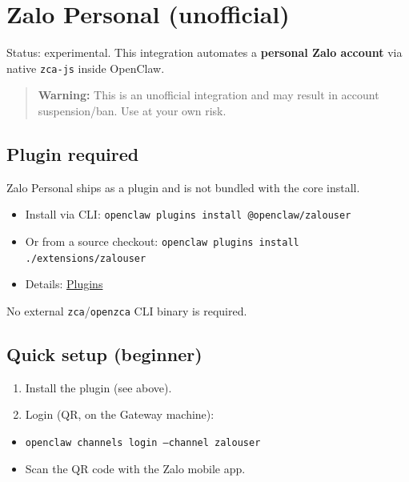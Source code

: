 \clearpage

\section{Zalo Personal (unofficial)}


Status: experimental. This integration automates a \textbf{personal Zalo account} via native \texttt{zca-js} inside OpenClaw.

\begin{quote}
\textbf{Warning:} This is an unofficial integration and may result in account suspension/ban. Use at your own risk.
\end{quote}


\subsection{Plugin required}


Zalo Personal ships as a plugin and is not bundled with the core install.

\begin{itemize}
  \item Install via CLI: \texttt{openclaw plugins install @openclaw/zalouser}
  \item Or from a source checkout: \texttt{openclaw plugins install ./extensions/zalouser}
  \item Details: \href{/tools/plugin}{Plugins}
\end{itemize}


No external \texttt{zca}/\texttt{openzca} CLI binary is required.

\subsection{Quick setup (beginner)}


\begin{enumerate}
  \item Install the plugin (see above).
  \item Login (QR, on the Gateway machine):
\end{enumerate}

\begin{itemize}
  \item \texttt{openclaw channels login --channel zalouser}
  \item Scan the QR code with the Zalo mobile app.
\end{itemize}

